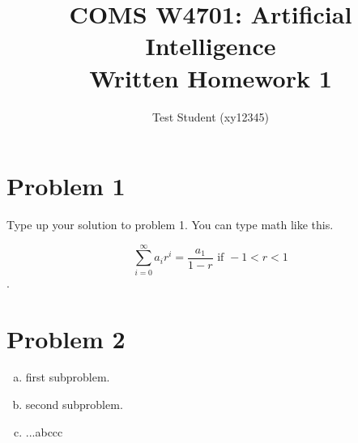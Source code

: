 \documentclass[11pt]{article}
\begin{document}
 
 
\title{COMS W4701: Artificial Intelligence\\
       Written Homework 1}
\author{Test Student (xy12345)} %
\maketitle

\section*{Problem 1} 
 
Type up your solution to problem 1. You can type math like this. 

$$\sum\limits_{i=0}^\infty a_i r^i = \frac{a_1}{1-r} \text{ if } -1 < r < 1$$.

\section*{Problem 2}

\begin{enumerate}[(a)]
    \item first subproblem. 
    \item second subproblem.
    \item ...abccc
\end{enumerate}

 
\end{document}
